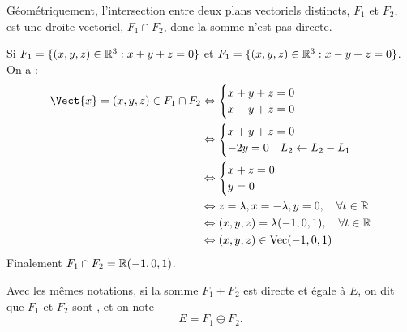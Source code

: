 \documentclass{book}
\begin{document}
\begin{Exemple} Géométriquement, l'intersection entre deux plans vectoriels distincts, $F_1$ et $F_2$, est une droite vectoriel, $F_1\cap F_2$, donc la somme n'est pas directe.
\begin{center}
\end{center}
Si $F_1=\{(x,y,z)\in\mathbb{R}^3: x+y+z=0\}$ et $F_1=\{(x,y,z)\in\mathbb{R}^3: x-y+z=0\}$. On a :
$$\begin{aligned}
 \Vect{x}=(x,y,z)\in F_1 \cap F_2 & \Leftrightarrow \begin{cases}x+y+z=0 \\ x-y+z=0 \end{cases}\\
 & \Leftrightarrow \begin{cases}x+y+z=0 \\ -2y=0 \quad L_2\leftarrow L_2 - L_1\end{cases}\\
 & \Leftrightarrow \begin{cases}x+z=0 \\ y=0 \end{cases}\\
 & \Leftrightarrow  z=\lambda, x=-\lambda , y=0,\quad  \forall t\in \R \\
 & \Leftrightarrow  (x,y,z) = \lambda(-1,0,1),\quad  \forall t\in \R \\
 & \Leftrightarrow  (x,y,z) \in \operatorname{Vec} ( -1,0,1)
 \end{aligned}$$
Finalement  $F_1 \cap F_2 = \mathbb{R}  ( -1,0,1)$. 
\end{Exemple}
\begin{Definition}[Supplémentaires]
Avec les mêmes notations, si la somme $F_1+F_2$ est directe et égale à $E$,
on dit que $F_1$ et $F_2$ sont , et on note
\[ E = F_1\oplus F_2. \]
\end{Definition}
\end{document}
